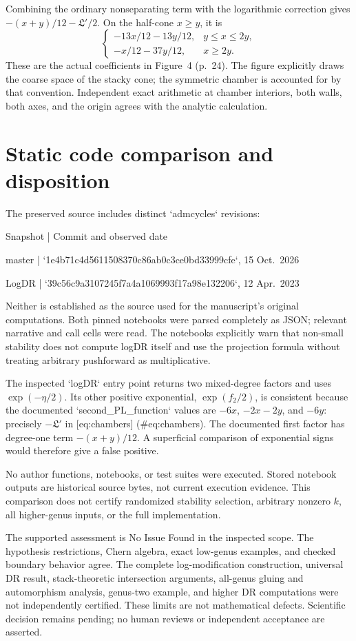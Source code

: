 \documentclass[10pt]{article}
\begin{document}
Combining the ordinary nonseparating term with the logarithmic correction gives \(-(x+y)/12-\mathfrak L'/2\). On the half-cone \(x\ge y\), it is \[\begin{cases}
 -13x/12-13y/12,&y\le x\le2y,\\
 -x/12-37y/12,&x\ge2y.
 \end{cases}\] These are the actual coefficients in Figure 4 (p. 24). The figure explicitly draws the coarse space of the stacky cone; the symmetric chamber is accounted for by that convention. Independent exact arithmetic at chamber interiors, both walls, both axes, and the origin agrees with the analytic calculation.\par
\section*{Static code comparison and disposition}
The preserved source includes distinct `admcycles` revisions:\par
Snapshot | Commit and observed date\par
master | `1e4b71c4d5611508370c86ab0c3ce0bd33999cfe`, 15 Oct. 2026\par
LogDR | `39c56c9a3107245f7a4a1069993f17a98e132206`, 12 Apr. 2023\par
Neither is established as the source used for the manuscript’s original computations. Both pinned notebooks were parsed completely as JSON; relevant narrative and call cells were read. The notebooks explicitly warn that non-small stability does not compute logDR itself and use the projection formula without treating arbitrary pushforward as multiplicative.\par
The inspected `logDR` entry point returns two mixed-degree factors and uses \(\exp(-\eta/2)\). Its other positive exponential, \(\exp(f_2/2)\), is consistent because the documented `second\_PL\_function` values are \(-6x\), \(-2x-2y\), and \(-6y\): precisely \(-\mathfrak L'\) in [eq:chambers] (\#eq:chambers). The documented first factor has degree-one term \(-(x+y)/12\). A superficial comparison of exponential signs would therefore give a false positive.\par
No author functions, notebooks, or test suites were executed. Stored notebook outputs are historical source bytes, not current execution evidence. This comparison does not certify randomized stability selection, arbitrary nonzero \(k\), all higher-genus inputs, or the full implementation.\par
The supported assessment is No Issue Found in the inspected scope. The hypothesis restrictions, Chern algebra, exact low-genus examples, and checked boundary behavior agree. The complete log-modification construction, universal DR result, stack-theoretic intersection arguments, all-genus gluing and automorphism analysis, genus-two example, and higher DR computations were not independently certified. These limits are not mathematical defects. Scientific decision remains pending; no human reviews or independent acceptance are asserted.\par
\end{document}
